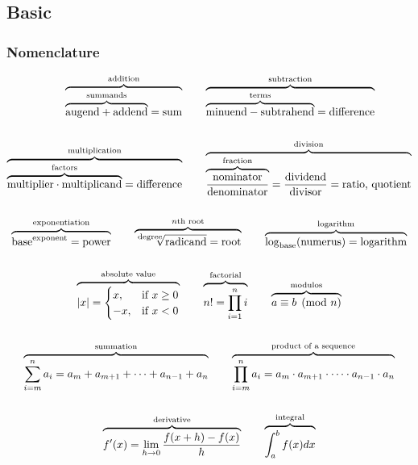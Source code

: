 \subsection{Basic}
\subsubsection{Nomenclature}


\begin{gather*}
\begin{alignedat}{1}
    \overbrace{
        \overbrace{
        \text{augend}+\text{addend}
        }^{\text{summands}}=\text{sum}
    }^{\text{addition}} \qquad
    &
    \overbrace{
        \overbrace{
        \text{minuend}-\text{subtrahend}
        }^{\text{terms}}=\text{difference}
    }^\text{subtraction}
    \\\\
    \overbrace{
        \overbrace{
        \text{multiplier}\cdot\text{multiplicand}
        }^{\text{factors}}=\text{difference}
    }^\text{multiplication} \qquad
    &
    \overbrace{
        \overbrace{
        \dfrac{\text{nominator}}{\text{denominator}}
        }^\text{fraction}=\dfrac{\text{dividend}}{\text{divisor}}=\text{ratio, quotient}
    }^\text{division}
\end{alignedat} \\\\
%
\overbrace{
    \text{base}^\text{exponent} = \text{power}
}^\text{exponentiation} \qquad
\overbrace{
    \sqrt[\text{\scriptsize degree}]{\text{radicand}}=\text{root}
}^{n\text{th root}} \qquad
\overbrace{
    \log_\text{base}(\text{numerus})=\text{logarithm}
}^\text{logarithm}
\\\\
%
\overbrace{
    |x| = \begin{cases} x, & \text{if } x \geq 0 \\ -x, & \text{if } x < 0 \end{cases}
}^\text{absolute value} \qquad
%
\overbrace{
    n! = \prod_{i=1}^{n} i
}^\text{factorial} \qquad
%
\overbrace{
    a \equiv b \pmod{n}
}^\text{modulos}
\\\\
%
\overbrace{
    \sum_{i=m}^n a_i = a_m + a_{m+1} + \cdots + a_{n-1} + a_n
}^\text{summation} \qquad
%
\overbrace{
    \prod_{i=m}^n a_i = a_m \cdot a_{m+1} \cdot \cdots \cdot a_{n-1} \cdot a_n
}^\text{product of a sequence}
\\\\
%
\overbrace{
    f'(x) = \lim_{h \to 0} \frac{f(x+h) - f(x)}{h}
}^\text{derivative} \qquad
%
\overbrace{
    \int_a^b f(x) dx
}^\text{integral}
\end{gather*}

